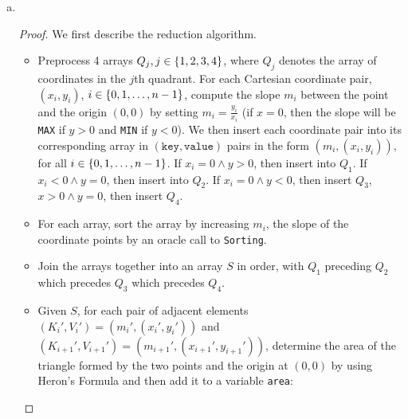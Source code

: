 \documentclass[11pt]{scrartcl}
\theoremstyle{dotlessP}
\theoremstyle{dotlessN}
\DeclarePairedDelimiter\set{\{}{\}}
\begin{document}
\begin{enumerate}[(a)]
\begin{proof}
	Then, the runtime of $\pi$ can be bounded by the sum of the maximum time for preprocessing and postprocessing for $\gamma$ and the maximum time it takes for all calls of $\gamma$. As each call of $\gamma$ takes time $T(n)$ for an input size $n$ and the greatest input size possible is $h(n)$, then each call of $\gamma$ takes time at most $O(T(h(n)))$. 
	\\

	As $\gamma$ is called at most $k(n)$ times, the maximum time for all calls of $\gamma$ is $O(k(n)T(h(n)))$. As the reduction runs in time at most $g(n)$, then the preprocessing and postprocessing for $\gamma$ takes at most $O(g(n))$ time. Thus, the maximum time it takes for an algorithm $\pi$ to solve $\Pi$ is $O(g(n) + k(n)\cdot T(h(n)))$. It follows that the maximum time it takes for $\Pi$ to be solved if $\Gamma$ can be solved in at most $T(n)$ is $O(g(n) + k(n)\cdot T(h(n)))$.
\end{proof}
\item 
	\
	\begin{proof}
		We first describe the reduction algorithm.
		\begin{itemize}
			\item Preprocess 4 arrays $Q_j, j \in \set*{1,2,3,4}$, where $Q_j$ denotes the array of coordinates in the $j$th quadrant. For each Cartesian coordinate pair,  $(x_i, y_i)$,  $i \in \set*{0,1,\dots, n-1}$, compute the slope $m_i$ between the point and the origin $(0,0)$ by setting $m_i = \displaystyle\frac{y_i}{x_i}$ (if $x = 0$, then the slope will be \texttt{MAX} if $y>0$ and \texttt{MIN} if $y < 0$). We then insert each coordinate pair into its corresponding array in $(\texttt{key}, \texttt{value})$ pairs in the form  $(m_i, (x_i, y_i))$, for all  $i \in \set*{0,1,\dots,n-1}$. If $x_i = 0 \land y > 0$, then insert into  $Q_1$. If $x_i < 0 \land y = 0$, then insert into  $Q_2$. If  $x_i = 0 \land y < 0$, then insert  $Q_3$, $x > 0 \land y = 0$, then insert  $Q_4$.
			\item For each array, sort the array by increasing $m_i$, the slope of the coordinate points by an oracle call to \texttt{Sorting}.
			\item Join the arrays together into an array $S$ in order, with $Q_1$ preceding  $Q_2$ which precedes $Q_3$ which precedes $Q_4$.
			\item Given $S$, for each pair of adjacent elements $(K_i', V_i') = (m_i', (x_i', y_i'))$ and $(K_{i+1}', V_{i+1}') = (m_{i+1}', (x_{i+1}', y_{i+1}'))$, determine the area of the triangle formed by the two points and the origin at $(0,0)$ by using Heron's Formula and then add it to a variable \texttt{area}:

\end{itemize}
\end{proof}
\end{enumerate}
\end{document}
